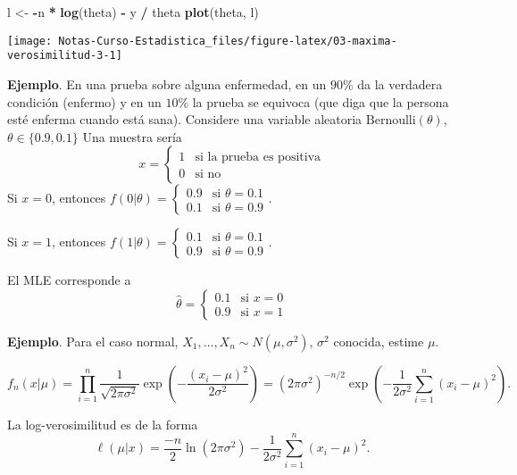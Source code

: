 \documentclass[
  12pt,
]{book}
\newenvironment{Shaded}{\begin{snugshade}}{\end{snugshade}}
\newcommand{\KeywordTok}[1]{\textcolor[rgb]{0.13,0.29,0.53}{\textbf{#1}}}
\newcommand{\NormalTok}[1]{#1}
\newcommand{\OperatorTok}[1]{\textcolor[rgb]{0.81,0.36,0.00}{\textbf{#1}}}
\newcommand{\StringTok}[1]{\textcolor[rgb]{0.31,0.60,0.02}{#1}}
\begin{document}
\begin{Shaded}
\begin{Highlighting}[]
\NormalTok{l \textless{}{-}}\StringTok{ }\OperatorTok{{-}}\NormalTok{n }\OperatorTok{*}\StringTok{ }\KeywordTok{log}\NormalTok{(theta) }\OperatorTok{{-}}\StringTok{ }\NormalTok{y }\OperatorTok{/}\StringTok{ }\NormalTok{theta}
\KeywordTok{plot}\NormalTok{(theta, l)}
\end{Highlighting}
\end{Shaded}

\begin{center}\texttt{[image: Notas-Curso-Estadistica\_files/figure-latex/03-maxima-verosimilitud-3-1]} \end{center}

\textbf{Ejemplo}. En una prueba sobre alguna enfermedad, en un \(90\%\) da la verdadera condición (enfermo) y en un \(10\%\) la prueba se equivoca (que diga que la persona esté enferma cuando está sana). Considere una variable aleatoria \(\text{Bernoulli}(\theta)\),\(\theta \in \{0.9,0.1\}\)
Una muestra sería
\[x = \begin{cases}1 & \text{si la prueba es positiva}\\0& \text{si no}\end{cases}\]
Si \(x=0\), entonces \(f(0|\theta) = \begin{cases}0.9 & \text{si }\theta = 0.1\\0.1& \text{si }\theta = 0.9\end{cases}\).

Si \(x=1\), entonces \(f(1|\theta) = \begin{cases}0.1 & \text{si }\theta = 0.1\\0.9& \text{si }\theta = 0.9\end{cases}\).

El MLE corresponde a
\[\hat\theta = \begin{cases}0.1 & \text{si }x= 0\\0.9& \text{si }x= 1\end{cases}\]

\textbf{Ejemplo}. Para el caso normal, \(X_1,\dots, X_n \sim N(\mu,\sigma^2)\), \(\sigma^2\) conocida, estime \(\mu\).

\[f_n(x|\mu) = \prod_{i=1}^n \dfrac{1}{\sqrt{2\pi\sigma^2}}\exp\left(-\dfrac{(x_i-\mu)^2}{2\sigma^2}\right) = (2\pi\sigma^2)^{-n/2}\exp\left(-\dfrac1{2\sigma^2}\sum_{i=1}^n(x_i-\mu)^2\right).\]

La log-verosimilitud es de la forma
\[ \ell(\mu|x) = \dfrac{-n}{2}\ln(2\pi\sigma^2)-\dfrac1{2\sigma^2}\sum_{i=1}^n(x_i-\mu)^2.\]
\end{document}
